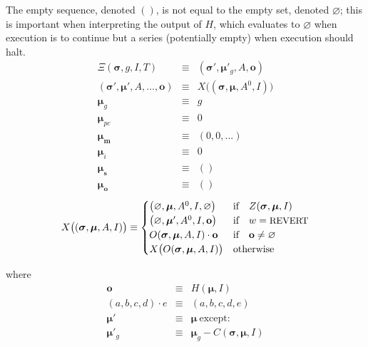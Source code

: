 \documentclass[9pt,oneside]{amsart}
\begin{document}
\begin{multicols}{2}
The empty sequence, denoted $()$, is not equal to the empty set, denoted $\varnothing$; this is important when interpreting the output of $H$, which evaluates to $\varnothing$ when execution is to continue but a series (potentially empty) when execution should halt.
\begin{eqnarray}
\Xi(\boldsymbol{\sigma}, g, I, T) & \equiv & (\boldsymbol{\sigma}'\!, \boldsymbol{\mu}'_g, A, \mathbf{o}) \\
(\boldsymbol{\sigma}', \boldsymbol{\mu}'\!, A, ..., \mathbf{o}) & \equiv & X\big((\boldsymbol{\sigma}, \boldsymbol{\mu}, A^0\!, I)\big) \\
\boldsymbol{\mu}_g & \equiv & g \\
\boldsymbol{\mu}_{pc} & \equiv & 0 \\
\boldsymbol{\mu}_\mathbf{m} & \equiv & (0, 0, ...) \\
\boldsymbol{\mu}_i & \equiv & 0 \\
\boldsymbol{\mu}_\mathbf{s} & \equiv & () \\
\boldsymbol{\mu}_\mathbf{o} & \equiv & ()
\end{eqnarray}
\begin{equation} \label{eq:X-def}
X\big( (\boldsymbol{\sigma}, \boldsymbol{\mu}, A, I) \big) \equiv \begin{cases}
\big(\varnothing, \boldsymbol{\mu}, A^0, I, \varnothing\big) & \text{if} \quad Z(\boldsymbol{\sigma}, \boldsymbol{\mu}, I) \\
\big(\varnothing, \boldsymbol{\mu}', A^0, I, \mathbf{o}\big) & \text{if} \quad w = \text{\small REVERT} \\
O(\boldsymbol{\sigma}, \boldsymbol{\mu}, A, I) \cdot \mathbf{o} & \text{if} \quad \mathbf{o} \neq \varnothing \\
X\big(O(\boldsymbol{\sigma}, \boldsymbol{\mu}, A, I)\big) & \text{otherwise} \\
\end{cases}
\end{equation}

where
\begin{eqnarray}
\mathbf{o} & \equiv & H(\boldsymbol{\mu}, I) \\
(a, b, c, d) \cdot e & \equiv & (a, b, c, d, e) \\
\boldsymbol{\mu}' & \equiv & \boldsymbol{\mu}\ \text{except:} \\
\boldsymbol{\mu}'_g & \equiv & \boldsymbol{\mu}_g - C(\boldsymbol{\sigma}, \boldsymbol{\mu}, I)
\end{eqnarray}


\end{multicols}
\end{document}
